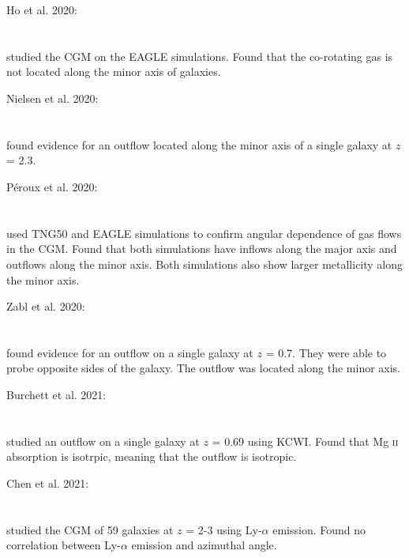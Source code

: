 \hline

Ho et al. 2020: \\
\citet{2020ApJ...904...76H} \\
\citep{2020ApJ...904...76H} \\
studied the CGM on the EAGLE simulations. Found that the co-rotating gas is not
located along the minor axis of galaxies. \\

\hline

Nielsen et al. 2020: \\
\citet{2020ApJ...904..164N} \\
\citep{2020ApJ...904..164N} \\
found evidence for an outflow located along the minor axis of a single galaxy at
$z$ = 2.3. \\

\hline

Péroux et al. 2020: \\
\citet{2020MNRAS.499.2462P} \\
\citep{2020MNRAS.499.2462P} \\
used TNG50 and EAGLE simulations to confirm angular dependence of gas flows in
the CGM. Found that both simulations have inflows along the major axis and
outflows along the minor axis. Both simulations also show larger metallicity
along the minor axis. \\

\hline

Zabl et al. 2020: \\
\citet{2020MNRAS.492.4576Z} \\
\citep{2020MNRAS.492.4576Z} \\
found evidence for an outflow on a single galaxy at $z$ = 0.7. They were able to
probe opposite sides of the galaxy. The outflow was located along the minor
axis. \\

\hline

Burchett et al. 2021: \\
\citet{2021ApJ...909..151B} \\
\citep{2021ApJ...909..151B} \\
studied an outflow on a single galaxy at $z$ = 0.69 using KCWI. Found that
Mg \textsc{ii} absorption is isotrpic, meaning that the outflow is isotropic. \\

\hline

Chen et al. 2021: \\
\citet{2021MNRAS.508...19C} \\
\citep{2021MNRAS.508...19C} \\
studied the CGM of 59 galaxies at $z$ = 2-3 using Ly-$\alpha$ emission. Found no
correlation between Ly-$\alpha$ emission and azimuthal angle. \\

